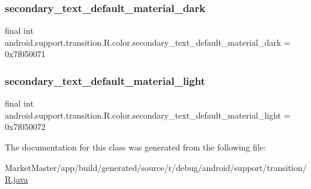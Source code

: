 \subsubsection{\texorpdfstring{secondary\+\_\+text\+\_\+default\+\_\+material\+\_\+dark}{secondary\_text\_default\_material\_dark}}
{\footnotesize\ttfamily final int android.\+support.\+transition.\+R.\+color.\+secondary\+\_\+text\+\_\+default\+\_\+material\+\_\+dark = 0x7f050071\hspace{0.3cm}{\ttfamily [static]}}

\mbox{\label{classandroid_1_1support_1_1transition_1_1R_1_1color_afbd843fca5d7d47368461266ae06ad27}} 
\subsubsection{\texorpdfstring{secondary\+\_\+text\+\_\+default\+\_\+material\+\_\+light}{secondary\_text\_default\_material\_light}}
{\footnotesize\ttfamily final int android.\+support.\+transition.\+R.\+color.\+secondary\+\_\+text\+\_\+default\+\_\+material\+\_\+light = 0x7f050072\hspace{0.3cm}{\ttfamily [static]}}



The documentation for this class was generated from the following file\+:\begin{DoxyCompactItemize}
\item 
Market\+Master/app/build/generated/source/r/debug/android/support/transition/\mbox{\hyperlink{debug_2android_2support_2transition_2R_8java}{R.\+java}}\end{DoxyCompactItemize}
